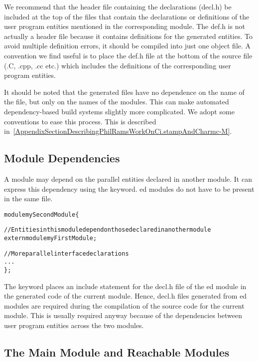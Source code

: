 We recommend that the header file containing the declarations (decl.h) be
included at the top of the files that contain the declarations or definitions
of the user program entities mentioned in the corresponding module. The def.h
is not actually a header file because it contains definitions for the generated
entities. To avoid multiple definition errors, it should be compiled into just
one object file. A convention we find useful is to place the def.h file at the
bottom of the source file (.C, .cpp, .cc etc.) which includes the definitions
of the corresponding user program entities.

\experimental
It should be noted that the generated files have no dependence on the name of the \ci
file, but only on the names of the modules. This can make automated dependency-based
build systems slightly more complicated. We adopt some conventions to ease this process.
This is described in~\ref{AppendixSectionDescribingPhilRamsWorkOnCi.stampAndCharmc-M}.


\subsection{Module Dependencies}

A module may depend on the parallel entities declared in another module. It can
express this dependency using the  keyword. ed modules
do not have to be present in the same \ci file.

\begin{alltt}
module mySecondModule \{

    // Entities in this module depend on those declared in another module
    extern module myFirstModule;

    // More parallel interface declarations
    ...
\};
\end{alltt}

The  keyword places an include statement for the decl.h file of the
ed module in the generated code of the current module. Hence,
decl.h files generated from ed modules are required during the
compilation of the source code for the current module. This is usually required
anyway because of the dependencies between user program entities across the two
modules.

\subsection{The Main Module and Reachable Modules}

